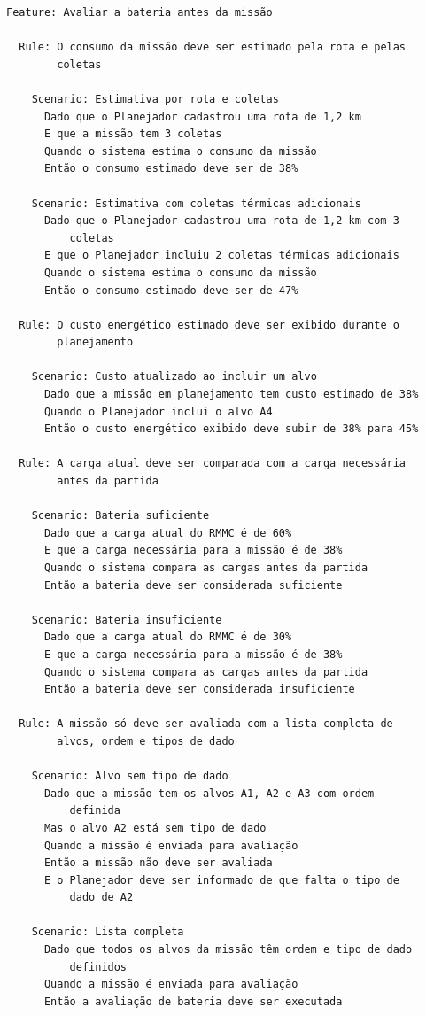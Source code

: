 \documentclass[a4paper, 12pt]{article}
\begin{document}
{\small
\begin{verbatim}
Feature: Avaliar a bateria antes da missão

  Rule: O consumo da missão deve ser estimado pela rota e pelas
        coletas

    Scenario: Estimativa por rota e coletas
      Dado que o Planejador cadastrou uma rota de 1,2 km
      E que a missão tem 3 coletas
      Quando o sistema estima o consumo da missão
      Então o consumo estimado deve ser de 38%

    Scenario: Estimativa com coletas térmicas adicionais
      Dado que o Planejador cadastrou uma rota de 1,2 km com 3
          coletas
      E que o Planejador incluiu 2 coletas térmicas adicionais
      Quando o sistema estima o consumo da missão
      Então o consumo estimado deve ser de 47%

  Rule: O custo energético estimado deve ser exibido durante o
        planejamento

    Scenario: Custo atualizado ao incluir um alvo
      Dado que a missão em planejamento tem custo estimado de 38%
      Quando o Planejador inclui o alvo A4
      Então o custo energético exibido deve subir de 38% para 45%

  Rule: A carga atual deve ser comparada com a carga necessária
        antes da partida

    Scenario: Bateria suficiente
      Dado que a carga atual do RMMC é de 60%
      E que a carga necessária para a missão é de 38%
      Quando o sistema compara as cargas antes da partida
      Então a bateria deve ser considerada suficiente

    Scenario: Bateria insuficiente
      Dado que a carga atual do RMMC é de 30%
      E que a carga necessária para a missão é de 38%
      Quando o sistema compara as cargas antes da partida
      Então a bateria deve ser considerada insuficiente

  Rule: A missão só deve ser avaliada com a lista completa de
        alvos, ordem e tipos de dado

    Scenario: Alvo sem tipo de dado
      Dado que a missão tem os alvos A1, A2 e A3 com ordem
          definida
      Mas o alvo A2 está sem tipo de dado
      Quando a missão é enviada para avaliação
      Então a missão não deve ser avaliada
      E o Planejador deve ser informado de que falta o tipo de
          dado de A2

    Scenario: Lista completa
      Dado que todos os alvos da missão têm ordem e tipo de dado
          definidos
      Quando a missão é enviada para avaliação
      Então a avaliação de bateria deve ser executada
\end{verbatim}
}
\end{document}
